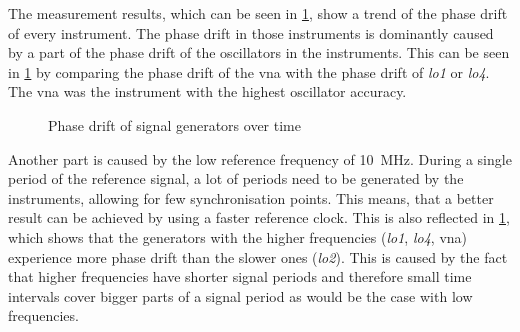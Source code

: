 \documentclass[12pt,a4paper,parskip=full,abstract=true,BCOR=12mm,twoside,open=right]{scrreprt}
\def\device#1{\mbox{\textit{#1}}}
\begin{document}
The measurement results, which can be seen in \cref{fig:phase_overall}, show a
trend of the phase drift of every instrument. The phase drift in those instruments is dominantly
caused by a part of the phase drift of the oscillators in the instruments. This
can be seen in \cref{fig:phase_overall} by comparing the phase drift of the \gls{vna}
with the phase drift of \device{lo1} or \device{lo4}. The \gls{vna} was the instrument
with the highest oscillator accuracy.

\begin{figure}[htb]
    \centering
    \caption{Phase drift of signal generators over time}
    \label{fig:phase_overall}
\end{figure}

Another part is caused by
the low reference frequency of \SI{10}{\mega\hertz}. During a single period of the reference
signal, a lot of periods need to be generated by the instruments, allowing for few
synchronisation points. This means, that a better result can be achieved by using a faster
reference clock. This is also reflected in \cref{fig:phase_overall}, which shows
that the generators with the higher frequencies (\device{lo1}, \device{lo4}, \gls{vna})
experience more phase drift than the slower ones (\device{lo2}). This
is caused by the fact that higher frequencies have shorter signal periods and therefore
small time intervals cover bigger parts of a signal period as would be the case with
low frequencies.
\end{document}
